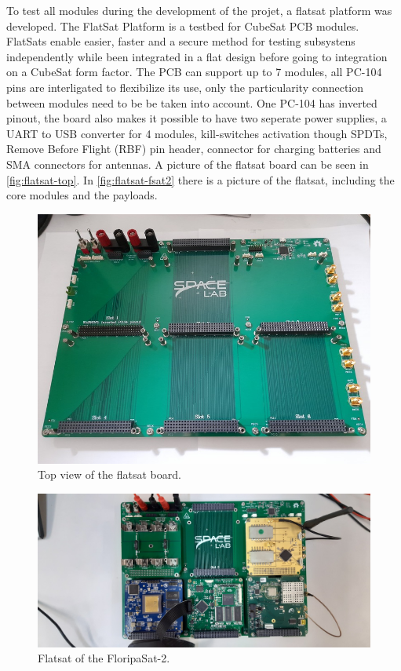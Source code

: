 To test all modules during the development of the projet, a flatsat platform was developed. The FlatSat Platform is a testbed for CubeSat PCB modules. FlatSats enable easier, faster and a secure method for testing subsystens independently while been integrated in a flat design before going to integration on a CubeSat form factor. The PCB can support up to 7 modules, all PC-104 pins are interligated to flexibilize its use, only the particularity connection between modules need to be be taken into account. One PC-104 has inverted pinout, the board also makes it possible to have two seperate power supplies, a UART to USB converter for 4 modules, kill-switches activation though SPDTs, Remove Before Flight (RBF) pin header, connector for charging batteries and SMA connectors for antennas. A picture of the flatsat board can be seen in \autoref{fig:flatsat-top}. In \autoref{fig:flatsat-fsat2} there is a picture of the flatsat, including the core modules and the payloads.

\begin{figure}[!ht]
    \begin{center}
        \includegraphics[width=\textwidth]{figures/flatsat-top}
        \caption{Top view of the flatsat board.}
        \label{fig:flatsat-top}
    \end{center}
\end{figure}

\begin{figure}[!ht]
    \begin{center}
        \includegraphics[width=\textwidth]{figures/flatsat}
        \caption{Flatsat of the FloripaSat-2.}
        \label{fig:flatsat-fsat2}
    \end{center}
\end{figure}

